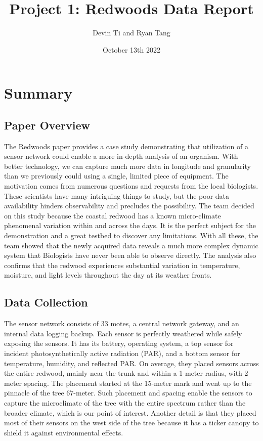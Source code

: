 \documentclass[11pt, letterpaper]{article}
\title{Project 1: Redwoods Data Report}
\author{Devin Ti and Ryan Tang}
\date{October 13th 2022}
\begin{document}
\maketitle

\section{Summary}
\subsection{Paper Overview}
The Redwoods paper provides a case study demonstrating that utilization of a sensor network could enable a more in-depth analysis of an organism. With better technology, we can capture much more data in longitude and granularity than we previously could using a single, limited piece of equipment.
The motivation comes from numerous questions and requests from the local biologists. These scientists have many intriguing things to study, but the poor data availability hinders observability and precludes
the possibility. The team decided on this study because the coastal redwood has a known micro-climate phenomenal variation within and across the days. It is the perfect subject for the demonstration and a great testbed to discover any limitations. With all these, the team showed that the newly acquired data reveals a much more complex dynamic system that Biologists have never been able to observe directly. The analysis also confirms that the redwood experiences substantial variation in temperature, moisture, and light levels throughout the day at its weather fronts.

\subsection{Data Collection}
The sensor network consists of 33 motes, a central network gateway, and an internal data logging backup. Each sensor is perfectly weathered while safely exposing the sensors. It has its battery, operating system, a top sensor for incident photosynthetically active radiation (PAR), and a bottom sensor for temperature, humidity, and reflected PAR. On average, they placed sensors across the entire redwood, mainly near the trunk and within a 1-meter radius, with 2-meter spacing. The placement started at the 15-meter mark and went up to the pinnacle of the tree 67-meter. Such placement and spacing enable the sensors to capture the microclimate of the tree with the entire spectrum rather than the broader climate, which is our point of interest. Another detail is that they placed most of their sensors on the west side of the tree because it has a ticker canopy to shield it against environmental effects.
\end{document}
